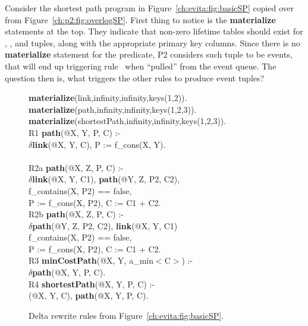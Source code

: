 Consider the shortest path program in Figure~\ref{ch:evita:fig:basicSP} copied
over from Figure~\ref{ch:p2:fig:overlogSP}.  First thing to notice is the {\bf
materialize} statements at the top.  They indicate that non-zero lifetime
tables should exist for , , and  tuples,
along with the appropriate primary key columns.  Since there is no {\bf
materialize} statement for the  predicate, P2 considers such
tuple to be events, that will end up triggering rule~ when ``pulled''
from the event queue.  The question then is, what triggers the other rules to
produce  event tuples?

\begin{figure}[!t]
\ssp
\centering
\begin{boxedminipage}{\linewidth}
{\bf materialize}(link,infinity,infinity,keys(1,2)). \\
{\bf materialize}(path,infinity,infinity,keys(1,2,3)).  \\
{\bf materialize}(shortestPath,infinity,infinity,keys(1,2,3)). \\
  
R1 {\bf path}(@X, Y, P, C) :- \\
\datalogspace $\delta${\bf link}(@X, Y, C), P := f\_cons(X, Y). \\
\\
R2a {\bf path}(@X, Z, P, C) :- \\
\datalogspace $\delta${\bf link}(@X, Y, C1), {\bf path}(@Y, Z, P2, C2),\\
\datalogspace f\_contains(X, P2) == false, \\
\datalogspace P := f\_cons(X, P2), C := C1 + C2. \\

R2b {\bf path}(@X, Z, P, C) :- \\
\datalogspace $\delta${\bf path}(@Y, Z, P2, C2), {\bf link}(@X, Y, C1) \\
\datalogspace f\_contains(X, P2) == false, \\
\datalogspace P := f\_cons(X, P2), C := C1 + C2. \\


R3 {\bf minCostPath}(@X, Y, a\_min$<$C$>$) :-  \\
\datalogspace $\delta${\bf path}(@X, Y, P, C). \\ 

R4 {\bf shortestPath}(@X, Y, P, C) :- \\
(@X, Y, C), {\bf path}(@X, Y, P, C).

\end{boxedminipage}
\caption{\label{ch:evita:fig:basicSPDelta}Delta rewrite rules from Figure~\ref{ch:evita:fig:basicSP}.}
\end{figure}

